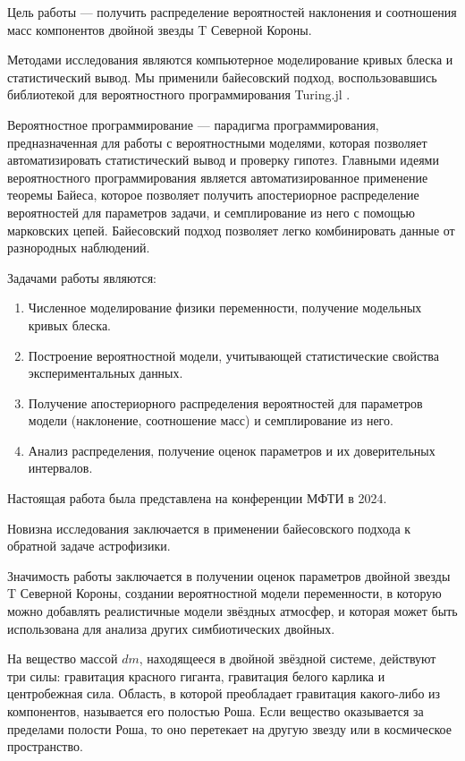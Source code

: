 Цель работы --- получить распределение вероятностей наклонения и соотношения масс компонентов двойной звезды T Северной Короны.

Методами исследования являются компьютерное моделирование кривых блеска и статистический вывод. Мы применили байесовский подход, воспользовавшись библиотекой для вероятностного программирования Turing.jl \cite{Turing}.

Вероятностное программирование --- парадигма программирования, предназначенная для работы с вероятностными моделями, которая позволяет автоматизировать статистический вывод и проверку гипотез. Главными идеями вероятностного программирования является автоматизированное применение теоремы Байеса, которое позволяет получить апостериорное распределение вероятностей для параметров задачи, и семплирование из него с помощью марковских цепей. Байесовский подход позволяет легко комбинировать данные от разнородных наблюдений.

Задачами работы являются:
\begin{enumerate}
    \item Численное моделирование физики переменности, получение модельных кривых блеска.
    \item Построение вероятностной модели, учитывающей статистические свойства экспериментальных данных.
    \item Получение апостериорного распределения вероятностей для параметров модели (наклонение, соотношение масс) и семплирование из него.
    \item Анализ распределения, получение оценок параметров и их доверительных интервалов.
\end{enumerate}

Настоящая работа была представлена на конференции МФТИ в 2024.

Новизна исследования заключается в применении байесовского подхода к обратной задаче астрофизики.

Значимость работы заключается в получении оценок параметров двойной звезды T Северной Короны, создании вероятностной модели переменности, в которую можно добавлять реалистичные модели звёздных атмосфер, и которая может быть использована для анализа других симбиотических двойных.




На вещество массой $dm$, находящееся в двойной звёздной системе, действуют три силы: гравитация красного гиганта, гравитация белого карлика и центробежная сила. Область, в которой преобладает гравитация какого-либо из компонентов, называется его полостью Роша. Если вещество оказывается за пределами полости Роша, то оно перетекает на другую звезду или в космическое пространство.

